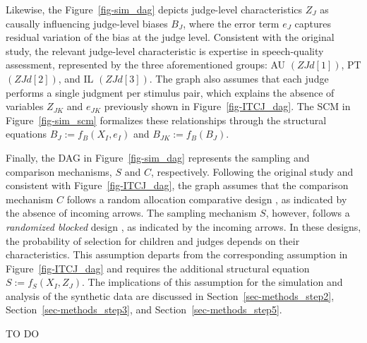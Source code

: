 \documentclass[
  authoryear,
  review,
  1p]{elsarticle}
\begin{document}
Likewise, the Figure~\ref{fig-sim_dag} depicts judge-level
characteristics \(Z_{J}\) as causally influencing judge-level biases
\(B_{J}\), where the error term \(e_{J}\) captures residual variation of
the bias at the judge level. Consistent with the original study, the
relevant judge-level characteristic is expertise in speech-quality
assessment, represented by the three aforementioned groups: AU
\((ZJd[1])\), PT \((ZJd[2])\), and IL \((ZJd[3])\). The graph also
assumes that each judge performs a single judgment per stimulus pair,
which explains the absence of variables \(Z_{JK}\) and \(e_{JK}\)
previously shown in Figure~\ref{fig-ITCJ_dag}. The SCM in
Figure~\ref{fig-sim_scm} formalizes these relationships through the
structural equations \(B_{J} := f_{B}(X_{I}, e_{I})\) and
\(B_{JK} := f_{B}(B_{J})\).

Finally, the DAG in Figure~\ref{fig-sim_dag} represents the sampling and
comparison mechanisms, \(S\) and \(C\), respectively. Following the
original study and consistent with Figure~\ref{fig-ITCJ_dag}, the graph
assumes that the comparison mechanism \(C\) follows a random allocation
comparative design \citep{Bramley_2015}, as indicated by the absence of
incoming arrows. The sampling mechanism \(S\), however, follows a
\emph{randomized blocked} design \citep{Lawson_2015}, as indicated by
the incoming arrows. In these designs, the probability of selection for
children and judges depends on their characteristics. This assumption
departs from the corresponding assumption in Figure~\ref{fig-ITCJ_dag}
and requires the additional structural equation
\(S := f_{S}(X_{I}, Z_{J})\). The implications of this assumption for
the simulation and analysis of the synthetic data are discussed in
Section~\ref{sec-methods_step2}, Section~\ref{sec-methods_step3}, and
Section~\ref{sec-methods_step5}.

{TO DO}
\end{document}
